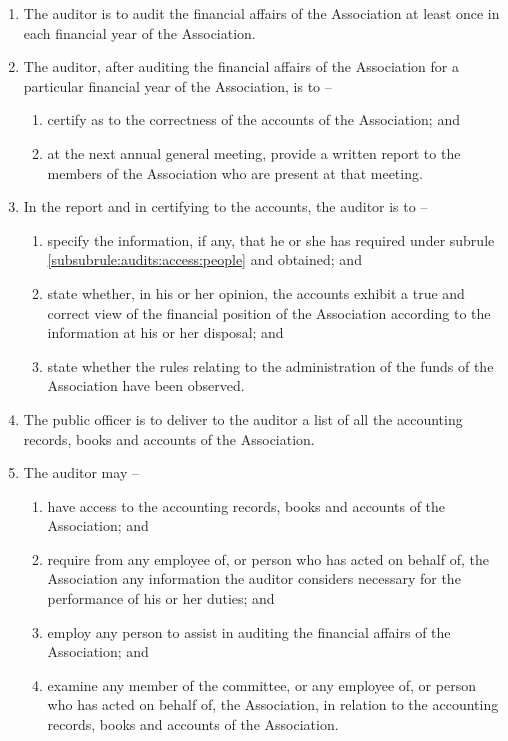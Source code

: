\documentclass[a4paper,11pt]{article}
\begin{document}
\begin{enumerate}
	\item The auditor is to audit the financial affairs of the Association at least once in each financial year of the Association.
	
	\item The auditor, after auditing the financial affairs of the Association for a particular financial year of the Association, is to --
	\begin{enumerate}
		\item certify as to the correctness of the accounts of the Association; and
		\item at the next annual general meeting, provide a written report to the members of the Association who are present at that meeting.
	\end{enumerate}

	\item In the report and in certifying to the accounts, the auditor is to --
	\begin{enumerate}
		\item specify the information, if any, that he or she has required under subrule \ref{subsubrule:audits:access:people} and obtained; and
		\item state whether, in his or her opinion, the accounts exhibit a true and correct view of the financial position of the Association according to the information at his or her disposal; and
		\item state whether the rules relating to the administration of the funds of the Association have been observed.
	\end{enumerate}

	\item The public officer is to deliver to the auditor a list of all the accounting records, books and accounts of the Association.

	\item \label{subrule:audits:access} The auditor may --
	\begin{enumerate}
		\item have access to the accounting records, books and accounts of the Association; and
		\item \label{subsubrule:audits:access:people} require from any employee of, or person who has acted on behalf of, the Association any information the auditor considers necessary for the performance of his or her duties; and
		\item employ any person to assist in auditing the financial affairs of the Association; and
		\item examine any member of the committee, or any employee of, or person who has acted on behalf of, the Association, in relation to the accounting records, books and accounts of the Association.
	\end{enumerate}
\end{enumerate}
\end{document}
